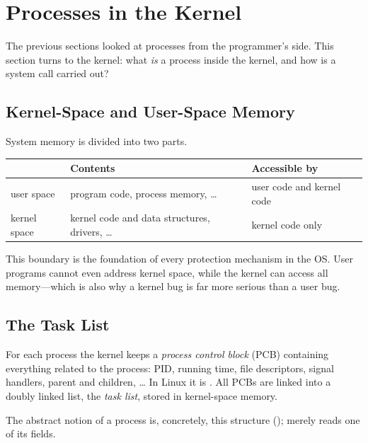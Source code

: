 \section{Processes in the Kernel}
\label{sec:kernel}

The previous sections looked at processes from the programmer's side. This section turns to the kernel: what \emph{is} a process inside the kernel, and how is a system call carried out?

\subsection{Kernel-Space and User-Space Memory}

\begin{definition}
  System memory is divided into two parts.
  \begin{center}
  \begin{tabular}{lll}
    \toprule
     & Contents & Accessible by \\
    \midrule
    user space & program code, process memory, \dots & user code and kernel code \\
    kernel space & kernel code and data structures, drivers, \dots & kernel code only \\
    \bottomrule
  \end{tabular}
  \end{center}
\end{definition}

This boundary is the foundation of every protection mechanism in the OS. User programs cannot even address kernel space, while the kernel can access all memory---which is also why a kernel bug is far more serious than a user bug.

\subsection{The Task List}

\begin{definition}
  For each process the kernel keeps a \emph{process control block} (PCB) containing everything related to the process: PID, running time, file descriptors, signal handlers, parent and children, \dots{} In Linux it is . All PCBs are linked into a doubly linked list, the \emph{task list}, stored in kernel-space memory.
\end{definition}

The abstract notion of a process is, concretely, this structure ();  merely reads one of its fields.


